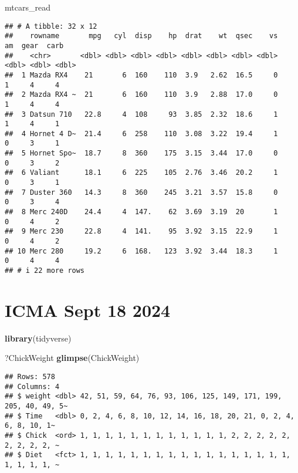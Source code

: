 \documentclass[
]{article}
\newenvironment{Shaded}{\begin{snugshade}}{\end{snugshade}}
\newcommand{\FunctionTok}[1]{\textcolor[rgb]{0.13,0.29,0.53}{\textbf{#1}}}
\newcommand{\NormalTok}[1]{#1}
\begin{document}
\begin{Shaded}
\begin{Highlighting}[]
\NormalTok{mtcars\_read}
\end{Highlighting}
\end{Shaded}

\begin{verbatim}
## # A tibble: 32 x 12
##    rowname       mpg   cyl  disp    hp  drat    wt  qsec    vs    am  gear  carb
##    <chr>       <dbl> <dbl> <dbl> <dbl> <dbl> <dbl> <dbl> <dbl> <dbl> <dbl> <dbl>
##  1 Mazda RX4    21       6  160    110  3.9   2.62  16.5     0     1     4     4
##  2 Mazda RX4 ~  21       6  160    110  3.9   2.88  17.0     0     1     4     4
##  3 Datsun 710   22.8     4  108     93  3.85  2.32  18.6     1     1     4     1
##  4 Hornet 4 D~  21.4     6  258    110  3.08  3.22  19.4     1     0     3     1
##  5 Hornet Spo~  18.7     8  360    175  3.15  3.44  17.0     0     0     3     2
##  6 Valiant      18.1     6  225    105  2.76  3.46  20.2     1     0     3     1
##  7 Duster 360   14.3     8  360    245  3.21  3.57  15.8     0     0     3     4
##  8 Merc 240D    24.4     4  147.    62  3.69  3.19  20       1     0     4     2
##  9 Merc 230     22.8     4  141.    95  3.92  3.15  22.9     1     0     4     2
## 10 Merc 280     19.2     6  168.   123  3.92  3.44  18.3     1     0     4     4
## # i 22 more rows
\end{verbatim}

\section{ICMA Sept 18 2024}\label{icma-sept-18-2024}

\begin{Shaded}
\begin{Highlighting}[]
\FunctionTok{library}\NormalTok{(tidyverse)}
\end{Highlighting}
\end{Shaded}

\begin{Shaded}
\begin{Highlighting}[]
\NormalTok{?ChickWeight}
\FunctionTok{glimpse}\NormalTok{(ChickWeight)}
\end{Highlighting}
\end{Shaded}

\begin{verbatim}
## Rows: 578
## Columns: 4
## $ weight <dbl> 42, 51, 59, 64, 76, 93, 106, 125, 149, 171, 199, 205, 40, 49, 5~
## $ Time   <dbl> 0, 2, 4, 6, 8, 10, 12, 14, 16, 18, 20, 21, 0, 2, 4, 6, 8, 10, 1~
## $ Chick  <ord> 1, 1, 1, 1, 1, 1, 1, 1, 1, 1, 1, 1, 2, 2, 2, 2, 2, 2, 2, 2, 2, ~
## $ Diet   <fct> 1, 1, 1, 1, 1, 1, 1, 1, 1, 1, 1, 1, 1, 1, 1, 1, 1, 1, 1, 1, 1, ~
\end{verbatim}
\end{document}
